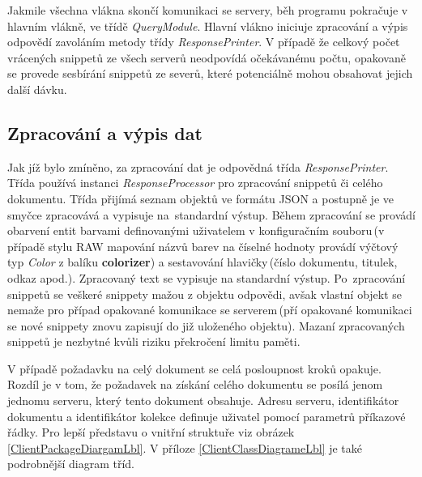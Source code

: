 Jakmile všechna vlákna skončí komunikaci se servery, běh programu pokračuje v hlavním vlákně, ve třídě \emph{QueryModule}. Hlavní vlákno iniciuje zpracování a výpis odpovědí zavoláním metody třídy   \emph{ResponsePrinter}. V případě že celkový počet vrácených snippetů ze všech serverů neodpovídá očekávanému počtu, opakovaně se provede sesbírání snippetů ze severů, které potenciálně mohou obsahovat jejich další dávku. 

\subsection*{Zpracování a výpis dat}
Jak jíž bylo zmíněno, za zpracování dat je odpovědná třída \emph{ResponsePrinter}. Třída používá instanci \emph{ResponseProcessor} pro zpracování snippetů či celého dokumentu. Třída přijímá seznam objektů ve formátu JSON a postupně je ve smyčce zpracovává a vypisuje na~standardní výstup. Během zpracování se provádí obarvení entit barvami definovanými uživatelem v konfiguračním souboru\,(v případě stylu RAW mapování názvů barev na číselné hodnoty provádí výčtový typ \emph{Color} z balíku \textbf{colorizer}) a sestavování hlavičky\,(číslo dokumentu, titulek, odkaz apod.). Zpracovaný text se vypisuje na standardní výstup. Po~zpracování snippetů se veškeré snippety mažou z objektu odpovědi, avšak vlastní objekt se nemaže pro případ opakované komunikace se serverem\,(pří opakované komunikaci se nové snippety znovu zapisují do již uloženého objektu). Mazaní zpracovaných snippetů je nezbytné kvůli riziku překročení limitu paměti.

V případě požadavku na celý dokument se celá posloupnost kroků opakuje. Rozdíl je v tom, že požadavek na získání celého dokumentu se posílá jenom jednomu serveru, který tento dokument obsahuje. Adresu serveru, identifikátor dokumentu a identifikátor kolekce definuje uživatel pomocí parametrů příkazové řádky. Pro lepší představu o vnitřní struktuře viz obrázek \ref{ClientPackageDiargamLbl}. V příloze \ref{ClientClassDiagrameLbl} je také podrobnější diagram tříd.



